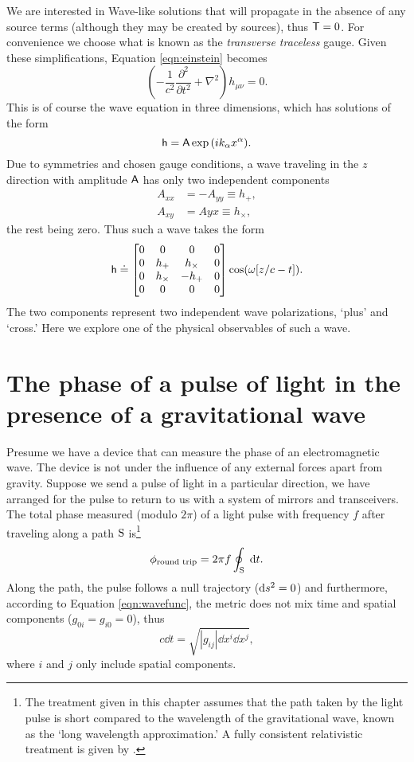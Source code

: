 We are interested in Wave-like solutions that will propagate in the absence of any source terms (although they may be created by sources), thus $\mathsf{T}=0$. %
For convenience we choose what is known as the \emph{transverse traceless} gauge. %
Given these simplifications, Equation \ref{eqn:einstein} becomes
\begin{equation}
\left(-\frac{1}{c^2}\frac{\partial^2}{\partial t^2}+\nabla^2\right)h_{\mu \nu}=0.
\end{equation}
This is of course the wave equation in three dimensions, which has solutions of the form
\begin{equation}
\mathsf{h}=\mathsf{A}\exp{(ik_\alpha x^\alpha)}.
\end{equation}
Due to symmetries and chosen gauge conditions, a wave traveling in the $z$ direction with amplitude $\mathsf{A}$ has only two independent components \cite[Chap. %
9]{schutz1985first}
\begin{align*}
A_{xx}&=-A_{yy}\equiv h_+,\\
A_{xy}&=A{yx}\equiv h_\times,
\end{align*}
the rest being zero. %
Thus such a wave takes the form
\begin{equation}
\label{eqn:wavefunc}
\mathsf{h} \doteq 
\left[\begin{matrix}
0 & 0 & 0 & 0 \\
0 & h_+ & h_\times & 0 \\
0 & h_\times & -h_+ & 0 \\
0 & 0 & 0 & 0
\end{matrix}\right]
\cos(\omega [z/c- t]).
\end{equation}
The two components represent two independent wave polarizations, `plus' and `cross.' Here we explore one of the physical observables of such a wave.

\section{The phase of a pulse of light in the presence of a gravitational wave}
Presume we have a device that can measure the phase of an electromagnetic wave. %
The device is not under the influence of any external forces apart from gravity. %
Suppose we send a pulse of light in a particular direction, we have arranged for the pulse to return to us with a system of mirrors and transceivers. %
The total phase measured (modulo $2\pi$) of a light pulse with frequency $f$ after traveling along a path $\rm S$ is\footnote{The treatment given in this chapter assumes that the path taken by the light pulse is short compared to the wavelength of the gravitational wave, known as the `long wavelength approximation.' A fully consistent relativistic treatment is given by \citet{RakhmanovPhoton}.}
\begin{equation}
\phi_{\text{round trip}} = 2\pi f\oint_{\rm S} \; \mathrm{d} t.
\end{equation}
Along the path, the pulse follows a null trajectory ($\mathrm{d} s^2=0$) and furthermore, according to Equation \ref{eqn:wavefunc}, the metric does not mix time and spatial components ($g_{0i}=g_{i0}=0$), thus
\begin{equation}
c\dd t = \sqrt{|g_{ij}|\dd x^i \dd x^j},
\end{equation}
where $i$ and $j$ only include spatial components.

